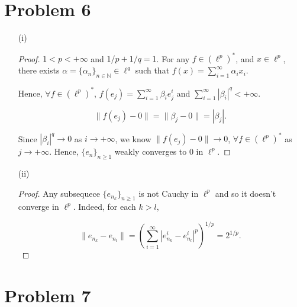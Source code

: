 \documentclass[12pt]{article}
\begin{document}
\section*{Problem 6}
\begin{enumerate}
\item [(i)]
\begin{proof}

$1<p<+\infty$ and $1/p + 1/q = 1$. For any $f\in (\ell^p)^*$, and $x\in \ell^p$, there exists $\alpha = \{\alpha_n\}_{n\in\mathbb N}\in \ell^q$ such that $f(x) = \sum_{i=1}^\infty \alpha_ix_i$.

Hence, $\forall f\in (\ell^p)^*$, $f(e_j) = \sum_{i=1}^\infty \beta_i e_j^i$ and $\sum_{i=1}^\infty |\beta_i|^q < +\infty$.

$$
\|f(e_j) - 0\| = \|\beta_j - 0\| = |\beta_j|.
$$

Since $|\beta_i|^q \rightarrow 0$ as $i \rightarrow +\infty$, we know $\|f(e_j) - 0\| \rightarrow 0$, $\forall f\in (\ell^p)^*$  as $j\rightarrow +\infty$. Hence, $\{e_n\}_{n\geqslant 1}$ weakly converges to $0$ in $\ell^p$.

\end{proof}

\item[(ii)]

\begin{proof}

Any subsequece $\{e_{n_k}\}_{n\geqslant 1}$ is not Cauchy in $\ell^p$ and so it doesn't converge in $\ell^p$. Indeed, for each $k>l$, 

$$
\|e_{n_k} - e_{n_l}\| = \left( \sum_{i = 1}^\infty |e^i_{n_k} - e^i_{n_l}|^p\right)^{1/p} = 2^{1/p}.
$$


\end{proof}
\end{enumerate}


\section*{Problem 7}
\end{document}
